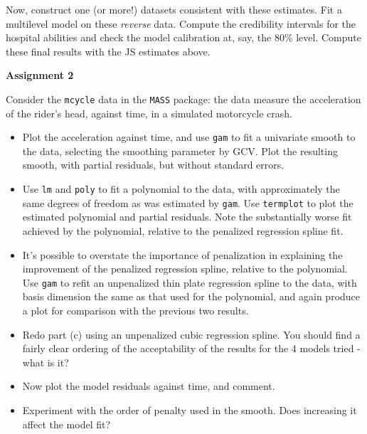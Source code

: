 \begin{itemize}
Now, construct one (or more!) datasets consistent with these estimates. Fit a multilevel model on these \emph{reverse} data.   Compute the credibility intervals for the hospital abilities and check the model calibration at, say, the 80\% level. Compute these final results with the JS estimates above.

\end{itemize}

\vspace{1cm}
\hspace{-0.8cm}
\textbf{Assignment 2}
\vspace{0.5cm}

Consider the \texttt{mcycle} data in the \texttt{MASS} package: the data measure the acceleration of the rider’s head, against time,
in a simulated motorcycle crash.
\begin{itemize}
\item  Plot the acceleration against time, and use \texttt{gam} to fit a univariate smooth to the data, selecting the smoothing parameter by GCV. Plot the resulting smooth, with partial residuals, but without standard errors.
\item Use \texttt{lm} and \texttt{poly} to fit a polynomial to the data, with approximately the same degrees of freedom as was estimated by \texttt{gam}. Use \texttt{termplot} to plot the estimated polynomial and partial residuals. Note the substantially worse fit achieved by the polynomial, relative to the penalized regression spline fit.
\item It's possible to overstate the importance of penalization in explaining the improvement of the penalized regression spline, relative to the polynomial. Use \texttt{gam} to refit an unpenalized thin plate regression spline to the data, with basis dimension the same as that used for the polynomial, and again produce a plot for comparison with the previous two results.
\item Redo part (c) using an unpenalized cubic regression spline. You should find a fairly clear ordering of the acceptability of the results for the 4 models tried - what is it?
\item Now plot the model residuals against time, and comment.
\item Experiment with the order of penalty used in the smooth. Does increasing it affect the model fit?
\end{itemize}










